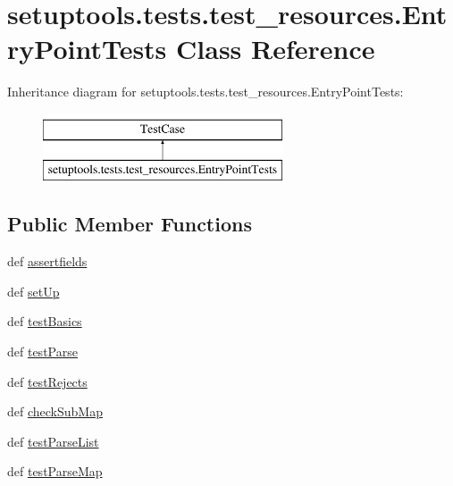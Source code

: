 \hypertarget{classsetuptools_1_1tests_1_1test__resources_1_1EntryPointTests}{}\section{setuptools.\+tests.\+test\+\_\+resources.\+Entry\+Point\+Tests Class Reference}
\label{classsetuptools_1_1tests_1_1test__resources_1_1EntryPointTests}
Inheritance diagram for setuptools.\+tests.\+test\+\_\+resources.\+Entry\+Point\+Tests\+:\begin{figure}[H]
\begin{center}
\leavevmode
\includegraphics[height=2.000000cm]{classsetuptools_1_1tests_1_1test__resources_1_1EntryPointTests}
\end{center}
\end{figure}
\subsection*{Public Member Functions}
\begin{DoxyCompactItemize}
\item 
def \hyperlink{classsetuptools_1_1tests_1_1test__resources_1_1EntryPointTests_a6951e23a8d3e2f8834ab8fecceb5d5d2}{assertfields}
\item 
def \hyperlink{classsetuptools_1_1tests_1_1test__resources_1_1EntryPointTests_a4ae4c9e66144393d30f13ba1cf09dafc}{set\+Up}
\item 
def \hyperlink{classsetuptools_1_1tests_1_1test__resources_1_1EntryPointTests_ae4069dfcb2fe1d95c4bb2278711ac98b}{test\+Basics}
\item 
def \hyperlink{classsetuptools_1_1tests_1_1test__resources_1_1EntryPointTests_ac40ec6fe5df29312ae3df2706f445923}{test\+Parse}
\item 
def \hyperlink{classsetuptools_1_1tests_1_1test__resources_1_1EntryPointTests_a758f4bea4842088047df80ba7af83aed}{test\+Rejects}
\item 
def \hyperlink{classsetuptools_1_1tests_1_1test__resources_1_1EntryPointTests_a46238bb5b8ad88193b6490d3057dbd46}{check\+Sub\+Map}
\item 
def \hyperlink{classsetuptools_1_1tests_1_1test__resources_1_1EntryPointTests_abb3f21f0405a81f6ac903eb6bd25064d}{test\+Parse\+List}
\item 
def \hyperlink{classsetuptools_1_1tests_1_1test__resources_1_1EntryPointTests_a436d24b56c6af5e718be231fce29b55a}{test\+Parse\+Map}
\end{DoxyCompactItemize}
